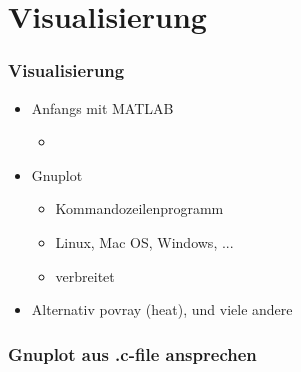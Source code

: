 \section{Visualisierung}

\begin{frame}
\frametitle{Visualisierung}
	\begin{itemize}[<+->]
	\item Anfangs mit MATLAB
		\begin{itemize}[<+->]
		\item 
		\end{itemize} 		
	\item Gnuplot
		\begin{itemize}[<+->]
		\item Kommandozeilenprogramm
		\item Linux, Mac OS, Windows, ...
		\item verbreitet
		\end{itemize} 
	\item Alternativ povray (heat), und viele andere
	\end{itemize} 
\end{frame}

\begin{frame}
\frametitle{Gnuplot aus .c-file ansprechen}
	
\end{frame}


